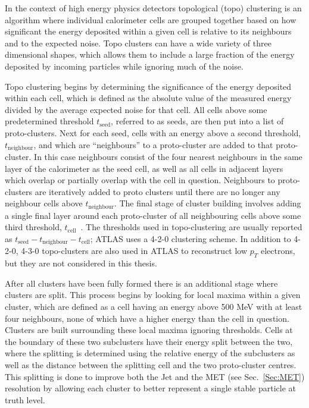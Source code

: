 In the context of high energy physics detectors topological (topo) clustering is an algorithm where individual calorimeter cells are grouped together based on how significant the energy deposited within a given cell is relative to its neighbours and to the expected noise.  
Topo clusters can have a wide variety of three dimensional shapes, which allows them to include a large fraction of the energy deposited by incoming particles while ignoring much of the noise.  

Topo clustering begins by determining the significance of the energy deposited within each cell, which is defined as the absolute value of the measured energy divided by the average expected noise for that cell.  
All cells above some predetermined threshold $t_{\mathrm{seed}}$, referred to as seeds, are then put into a list of proto-clusters.  
Next for each seed, cells with an energy above a second threshold, $t_{\mathrm{neighbour}}$, and which are ``neighbours'' to a proto-cluster are added to that proto-cluster.  
In this case neighbours consist of the four nearest neighbours in the same layer of the calorimeter as the seed cell, as well as all cells in adjacent layers which overlap or partially overlap with the cell in question.  
Neighbours to proto-clusters are iteratively added to proto clusters until there are no longer any neighbour cells above $t_{\mathrm{neighbour}}$.  
The final stage of cluster building involves adding a single final layer around each proto-cluster of all neighbouring cells above some third threshold, $t_{\mathrm{cell}}$~\cite{1603.02934}.  
The thresholds used in topo-clustering are usually reported as $t_{\mathrm{seed}}-t_{\mathrm{neighbour}}-t_{\mathrm{cell}}$; ATLAS uses a 4-2-0 clustering scheme.  
In addition to 4-2-0, 4-3-0 topo-clusters are also used in ATLAS to reconstruct low $p_T$ electrons, but they are not considered in this thesis.   

After all clusters have been fully formed there is an additional stage where clusters are split.  
This process begins by looking for local maxima within a given cluster, which are defined as a cell having an energy above 500 MeV with at least four neighbours, none of which have a higher energy than the cell in question.  
Clusters are built surrounding these local maxima ignoring thresholds.  
Cells at the boundary of these two subclusters have their energy split between the two, where the splitting is determined using the relative energy of the subclusters as well as the distance between the splitting cell and the two proto-cluster centres.  
This splitting is done to improve both the Jet and the \gls{MET} (see Sec.~\ref{Sec:MET}) resolution by allowing each cluster to better represent a single stable particle at truth level.  

